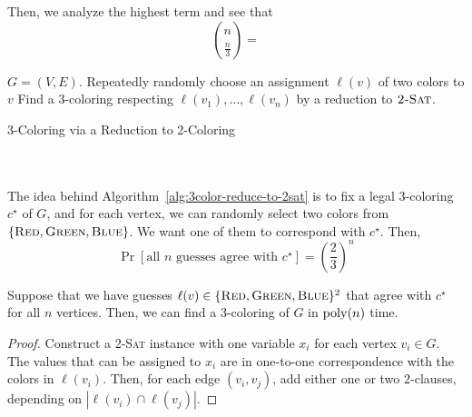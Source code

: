         Then, we analyze the highest term and see that 
        \begin{equation*}
            \binom{n}{\frac{n}{3}}=
        \end{equation*}
        \begin{algorithm}[H] 
            \begin{algorithmic}[1]
                \Require \(G=(V,E)\).
                        \State Repeatedly randomly choose an assignment \(\ell(v)\) of two colors to \(v\)
                    \EndFor
                    \State Find a \(3\)-coloring respecting \(\ell(v_1),\ldots,\ell(v_n)\) by a reduction to \(\textsc{2-Sat}\).
                \EndProcedure 
            \end{algorithmic}
            \caption{3-Coloring via a Reduction to 2-Coloring}
            \label{alg:3color-reduce-to-2sat}
        \end{algorithm}
        \vphantom
        \\
        \\
        The idea behind Algorithm~\ref{alg:3color-reduce-to-2sat} is to fix a legal \(3\)-coloring \(c^\star\) of \(G\), and for each vertex, we can randomly select two colors from \(\{\textsc{Red},\textsc{Green},\textsc{Blue}\}\). We want one of them to correspond with \(c^\star\). Then,
        \begin{equation*}
            \Pr[\text{all }n\text{ guesses agree with }c^\star]=\left(\frac{2}{3}\right)^n
        \end{equation*}
        \begin{lemma*}
            Suppose that we have guesses \(\ell(v)\in \{\textsc{Red},\textsc{Green},\textsc{Blue}\}^2\) that agree with \(c^\star\) for all \(n\) vertices. Then, we can find a \(3\)-coloring of \(G\) in \(\operatorname{poly}(n)\) time.
            \begin{proof}
                Construct a \textsc{2-Sat} instance with one variable \(x_i\) for each vertex \(v_i\in G\). The values that can be assigned to \(x_i\) are in one-to-one correspondence with the colors in \(\ell(v_i)\). Then, for each edge \((v_i,v_j)\), add either one or two \(2\)-clauses, depending on \(|\ell(v_i)\cap\ell(v_j)|\).
            \end{proof}
        \end{lemma*}
        \vphantom
        \\
        \\
